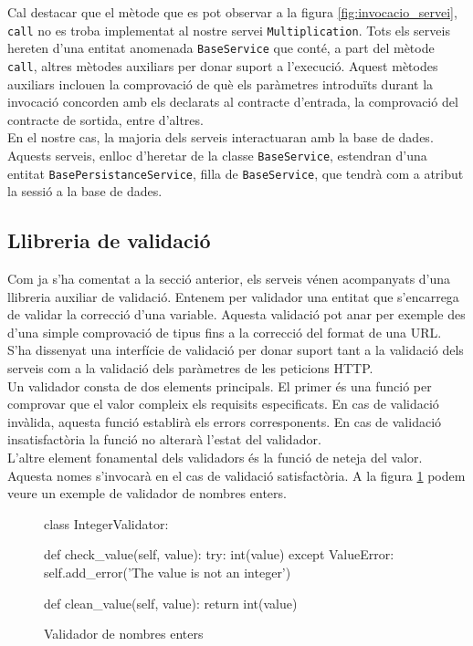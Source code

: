 	Cal destacar que el mètode que es pot observar a la figura \ref{fig:invocacio_servei}, \texttt{call} no es troba implementat al nostre servei \texttt{Multiplication}. Tots els serveis hereten d'una entitat anomenada \texttt{BaseService} que conté, a part del mètode \texttt{call}, altres mètodes auxiliars per donar suport a l'execució. Aquest mètodes auxiliars inclouen la comprovació de què els paràmetres introduïts durant la invocació concorden amb els declarats al contracte d'entrada, la comprovació del contracte de sortida, entre d'altres.\\
	
	En el nostre cas, la majoria dels serveis interactuaran amb la base de dades. Aquests serveis, enlloc d'heretar de la classe \texttt{BaseService}, estendran d'una entitat \texttt{BasePersistanceService}, filla de \texttt{BaseService}, que tendrà com a atribut la sessió a la base de dades.

	\subsection{Llibreria de validació} \label{validacio}
	
	Com ja s'ha comentat a la secció anterior, els serveis vénen acompanyats d'una llibreria auxiliar de validació. Entenem per validador una entitat que s'encarrega de validar la correcció d'una variable. Aquesta validació pot anar per exemple des d'una simple comprovació de tipus fins a la correcció del format de una \ac{URL}. \\
	
	S'ha dissenyat una interfície de validació per donar suport tant a la validació dels serveis com a la validació dels paràmetres de les peticions \ac{HTTP}.\\
	
	Un validador consta de dos elements principals. El primer és una funció per comprovar que el valor compleix els requisits especificats. En cas de validació invàlida, aquesta funció establirà els errors corresponents. En cas de validació insatisfactòria la funció no alterarà l'estat del validador.\\
	
	L'altre element fonamental dels validadors és la funció de neteja del valor. Aquesta nomes s'invocarà en el cas de validació satisfactòria.  A la figura \ref{fig:int_validador} podem veure un exemple de validador de nombres enters.\\
	
	\begin{figure}[h!]
		\begin{python}
class IntegerValidator:

	def check_value(self, value):
		try:
			int(value)
		except ValueError:
			self.add_error('The value is not an integer')
			
	def clean_value(self, value):
		return int(value)
		\end{python}
		\caption{Validador de nombres enters}
		\label{fig:int_validador}
	\end{figure}	
	 
